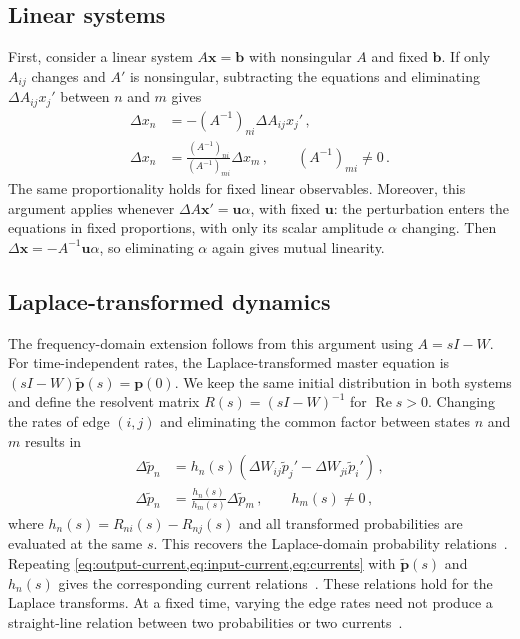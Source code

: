 \documentclass[
  reprint,
  superscriptaddress,
  amsmath,
  amssymb,
  aps,
  pre,
  longbibliography
]{revtex4-2}
\begin{document}
\subsection{Linear systems} 
First, consider a linear
system $A\bm x=\bm b$ with nonsingular $A$ and fixed $\bm b$.
If only $A_{ij}$ changes and $A'$ is nonsingular, subtracting the
equations and eliminating $\Delta A_{ij}x_j'$ between $n$ and $m$ gives
\begin{align}
    \Delta x_n&=-(A^{-1})_{ni}\Delta A_{ij}x_j'\,,\nonumber\\
    \Delta x_n&=\frac{(A^{-1})_{ni}}{(A^{-1})_{mi}}\Delta x_m\,,
    \qquad (A^{-1})_{mi}\ne0\,.
    \label{eq:linear-system}
\end{align}
The same proportionality holds for fixed linear observables. Moreover, this argument applies whenever $\Delta A\bm x'=\bm u\alpha$,
with fixed $\bm u$: the perturbation enters the equations in fixed
proportions, with only its scalar amplitude $\alpha$ changing.
Then $\Delta\bm x=-A^{-1}\bm u\alpha$, so eliminating $\alpha$
again gives mutual linearity.

\subsection{Laplace-transformed dynamics}

The frequency-domain extension follows from this argument using $A=sI-W$. For time-independent rates, the Laplace-transformed master equation is
$(sI-W)\widetilde{\bm p}(s)=\bm p(0)$.
We keep the same initial distribution in both systems and define the resolvent matrix
$R(s)=(sI-W)^{-1}$ for $\operatorname{Re}s>0$.
Changing the rates of edge $(i,j)$ and eliminating the common factor
between states $n$ and $m$ results in
\begin{align}
    \Delta\widetilde p_n
    &=h_n(s)(\Delta W_{ij}\widetilde p_j'
              -\Delta W_{ji}\widetilde p_i')\,,\nonumber\\
    \Delta\widetilde p_n
    &=\frac{h_n(s)}{h_m(s)}\Delta\widetilde p_m\,,
    \qquad h_m(s)\ne0\,,
    \label{eq:laplace}
\end{align}
where $h_n(s)=R_{ni}(s)-R_{nj}(s)$ and all transformed probabilities are evaluated at the same $s$.
This recovers the Laplace-domain probability relations~\cite{ZhengLu2026,VoitsSchwarz2026}.
Repeating \cref{eq:output-current,eq:input-current,eq:currents} with
$\widetilde{\bm p}(s)$ and $h_n(s)$ gives the corresponding current
relations~\cite{Harunari2024}.
These relations hold for the Laplace transforms. At a fixed time, varying the edge rates need not produce a straight-line relation between two probabilities or two currents~\cite{VoitsSchwarz2026}.
\end{document}
